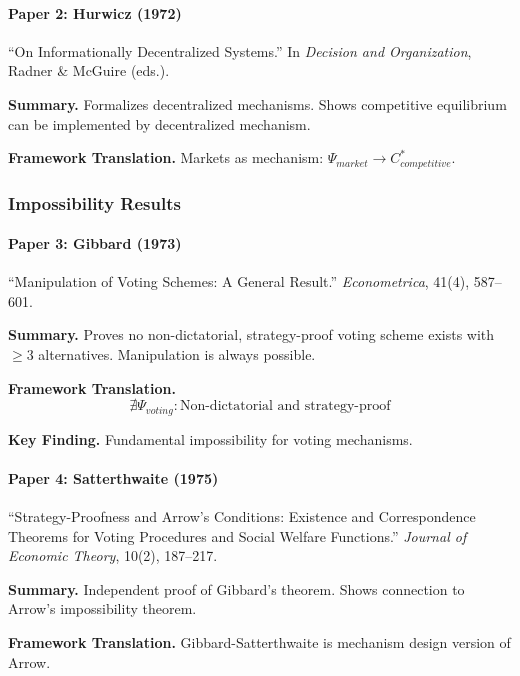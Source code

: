 \paragraph{Paper 2: Hurwicz (1972)}

``On Informationally Decentralized Systems.''
In \textit{Decision and Organization}, Radner \& McGuire (eds.).

\textbf{Summary.}
Formalizes decentralized mechanisms. Shows competitive equilibrium can be 
implemented by decentralized mechanism.

\textbf{Framework Translation.}
Markets as mechanism: $\Psi_{market} \to C^*_{competitive}$.

\subsubsection{Impossibility Results}

\paragraph{Paper 3: Gibbard (1973)}

``Manipulation of Voting Schemes: A General Result.''
\textit{Econometrica}, 41(4), 587--601.

\textbf{Summary.}
Proves no non-dictatorial, strategy-proof voting scheme exists with $\geq 3$ 
alternatives. Manipulation is always possible.

\textbf{Framework Translation.}
\begin{equation}
\nexists \Psi_{voting}: \text{Non-dictatorial and strategy-proof}
\end{equation}

\textbf{Key Finding.}
Fundamental impossibility for voting mechanisms.

\paragraph{Paper 4: Satterthwaite (1975)}

``Strategy-Proofness and Arrow's Conditions: Existence and Correspondence 
Theorems for Voting Procedures and Social Welfare Functions.''
\textit{Journal of Economic Theory}, 10(2), 187--217.

\textbf{Summary.}
Independent proof of Gibbard's theorem. Shows connection to Arrow's 
impossibility theorem.

\textbf{Framework Translation.}
Gibbard-Satterthwaite is mechanism design version of Arrow.

